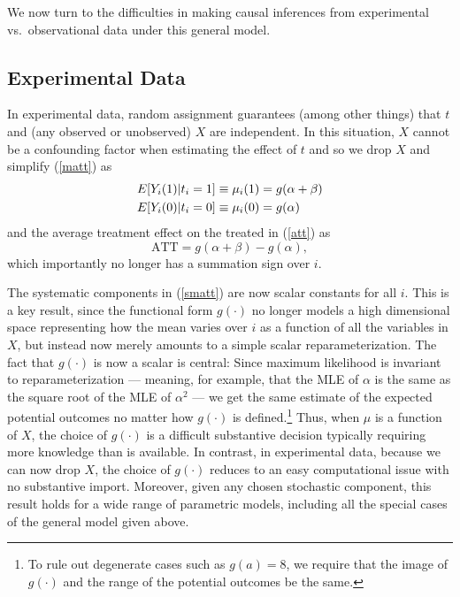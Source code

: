 \documentclass[11pt,titlepage]{article}
\begin{document}
We now turn to the difficulties in making causal inferences from
experimental vs.\ observational data under this general model.

\subsection{Experimental Data}\label{s:paraexp}

In experimental data, random assignment guarantees (among other
things) that $t$ and (any observed or unobserved) $X$ are independent.
In this situation, $X$ cannot be a confounding factor when estimating
the effect of $t$ and so we drop $X$ and simplify (\ref{matt}) as
\begin{align}
  \label{smatt}
  E[Y_i(1)|t_i=1] &\equiv \mu_i(1) = g(\alpha + \beta)\notag \\
  E[Y_i(0)|t_i=0] &\equiv \mu_i(0) = g(\alpha)
\end{align}
and the average treatment effect on the treated in (\ref{att}) as
\begin{equation}
  \label{satt}
  \text{ATT} = g(\alpha+\beta) - g(\alpha),
\end{equation}
which importantly no longer has a summation sign over $i$.

The systematic components in (\ref{smatt}) are now scalar constants
for all $i$.  This is a key result, since the functional form
$g(\cdot)$ no longer models a high dimensional space representing how
the mean varies over $i$ as a function of all the variables in $X$,
but instead now merely amounts to a simple scalar reparameterization.
The fact that $g(\cdot)$ is now a scalar is central: Since maximum
likelihood is invariant to reparameterization --- meaning, for
example, that the MLE of $\alpha$ is the same as the square root of
the MLE of $\alpha^2$ \citep[][p.75--76]{King89} --- we get the same
estimate of the expected potential outcomes no matter how $g(\cdot)$
is defined.\footnote{To rule out degenerate cases such as $g(a)=8$, we
  require that the image of $g(\cdot)$ and the range of the potential
  outcomes be the same.}  Thus, when $\mu$ is a function of $X$, the
choice of $g(\cdot)$ is a difficult substantive decision typically
requiring more knowledge than is available.  In contrast, in
experimental data, because we can now drop $X$, the choice of
$g(\cdot)$ reduces to an easy computational issue with no substantive
import.  Moreover, given any chosen stochastic component, this result
holds for a wide range of parametric models, including all the special
cases of the general model given above.
\end{document}
